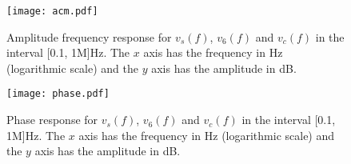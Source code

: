 \begin{figure}[H] \centering
\texttt{[image: acm.pdf]}
\caption{Amplitude frequency response for $v_s(f)$, $v_6(f)$ and $v_c(f)$ in the interval [0.1, 1M]Hz. The $x$ axis has the frequency in Hz (logarithmic scale) and the $y$ axis has the amplitude in dB. }
\label{fig:sim_acm}
\end{figure}
\par
\begin{figure}[H] \centering
\texttt{[image: phase.pdf]}
\caption{Phase response for $v_s(f)$, $v_6(f)$ and $v_c(f)$ in the interval [0.1, 1M]Hz. The $x$ axis has the frequency in Hz (logarithmic scale) and the $y$ axis has the amplitude in dB.}
\label{fig:sim_phase}
\end{figure}



